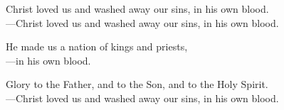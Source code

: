 \responsory

\noindent Christ loved us and washed away our sins, in his own blood.\\
{\color{red}---\thinspace}Christ loved us and washed away our sins, in his own blood.

\medskip\noindent He made us a nation of kings and priests,\\
{\color{red}---\thinspace}in his own blood.

\medskip\noindent Glory to the Father, and to the Son, and to the Holy Spirit.\\
{\color{red}---\thinspace}Christ loved us and washed away our sins, in his own blood.